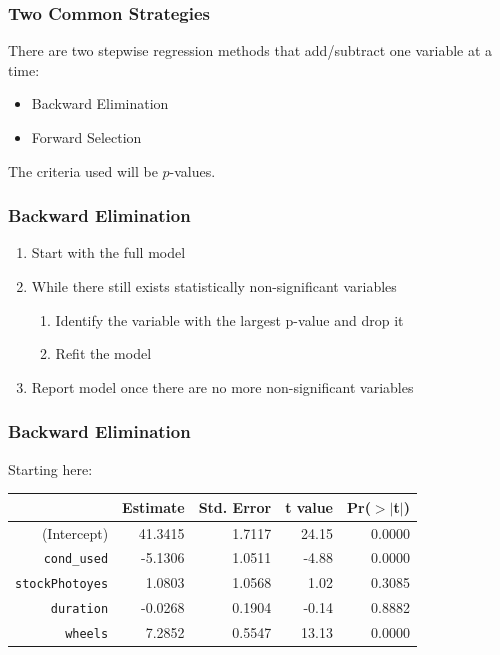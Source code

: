 \documentclass[handout]{beamer}
\newcommand{\blue}[1]{\textcolor{blue2}{#1}}
\begin{document}
\begin{frame}[fragile]
\frametitle{Two Common Strategies}

There are two \blue{stepwise regression} methods that add/subtract one variable at a time:
\begin{itemize}
\item Backward Elimination
\item Forward Selection
\end{itemize}

\pause
\vspace{0.5cm}

The criteria used will be $p$-values.  

\end{frame}


\begin{frame}[fragile]
\frametitle{Backward Elimination}

\begin{enumerate}
\item Start with the \blue{full model}
\pause\item While there still exists statistically non-significant variables
\begin{enumerate}
\item Identify the variable with the largest p-value and drop it
\item Refit the model
\end{enumerate}
\pause\item Report model once there are no more non-significant variables
\end{enumerate}

\end{frame}


\begin{frame}[fragile]
\frametitle{Backward Elimination}
Starting here:

\begin{table}[ht]
\centering
\begin{tabular}{r|rrrr}
  \hline
 & Estimate & Std. Error & t value & Pr($>$$|$t$|$) \\ 
  \hline
(Intercept) & 41.3415 & 1.7117 & 24.15 & 0.0000 \\ 
  {\tt cond\_used} & -5.1306 & 1.0511 & -4.88 & 0.0000 \\ 
  {\tt stockPhotoyes} & 1.0803 & 1.0568 & 1.02 & 0.3085 \\ 
  {\tt duration} & -0.0268 & 0.1904 & -0.14 & 0.8882 \\ 
  {\tt wheels} & 7.2852 & 0.5547 & 13.13 & 0.0000 \\ 
   \hline
\end{tabular}
\end{table}

\end{frame}
\end{document}
